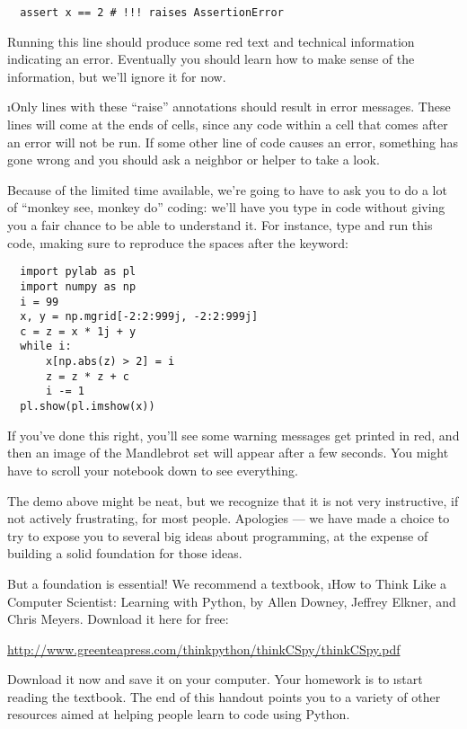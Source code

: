 \documentclass[letterpaper, 12pt, titlepage, twoside]{article}
\begin{document}
\begin{lstlisting}
  assert x == 2 # !!! raises AssertionError
\end{lstlisting}

Running this line should produce some red text and technical information
indicating an error. Eventually you should learn how to make sense of the
information, but we'll ignore it for now.

\i{Only} lines with these ``raise'' annotations should result in error
messages. These lines will come at the ends of cells, since any code within a
cell that comes after an error will not be run. If some other line of code
causes an error, something has gone wrong and you should ask a neighbor or
helper to take a look.

Because of the limited time available, we're going to have to ask you to do a
lot of ``monkey see, monkey do'' coding: we'll have you type in code without
giving you a fair chance to be able to understand it. For instance, type and
run this code, \i{making sure to reproduce the spaces after the 
  keyword}:

\begin{lstlisting}
  import pylab as pl
  import numpy as np
  i = 99
  x, y = np.mgrid[-2:2:999j, -2:2:999j]
  c = z = x * 1j + y
  while i:
      x[np.abs(z) > 2] = i
      z = z * z + c
      i -= 1
  pl.show(pl.imshow(x))
\end{lstlisting}

If you've done this right, you'll see some warning messages get printed in
red, and then an image of the Mandlebrot set will appear after a few seconds.
You might have to scroll your notebook down to see everything.

The demo above might be neat, but we recognize that it is not very
instructive, if not actively frustrating, for most people. Apologies --- we
have made a choice to try to expose you to several big ideas about
programming, at the expense of building a solid foundation for those ideas.

But a foundation is essential! We recommend a textbook, \i{How to Think Like a
  Computer Scientist: Learning with Python}, by Allen Downey, Jeffrey Elkner,
and Chris Meyers. Download it here for free:

\begin{center}
  \url{http://www.greenteapress.com/thinkpython/thinkCSpy/thinkCSpy.pdf}
\end{center}

Download it now and save it on your computer. Your homework is to \i{start
  reading the textbook}. The end of this handout points you to a variety of
other resources aimed at helping people learn to code using Python.
\end{document}
